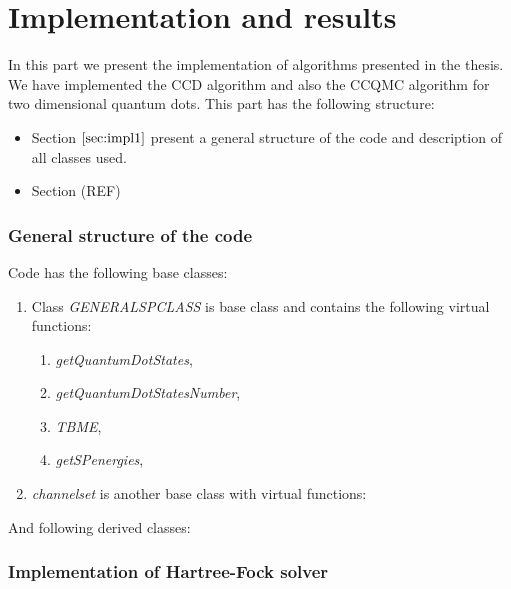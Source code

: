\documentclass[twoside,english]{uiofysmaster}
\theoremstyle{definition}
\begin{document}
\part{Implementation and results}
In this part we present the implementation of algorithms presented in the thesis. We have implemented the CCD algorithm and also the CCQMC algorithm for two dimensional quantum dots. 
This part has the following structure:\\
\begin{itemize}
\item Section $\ref{sec:impl1}$ present a general structure of the code and description of all classes used.
\item Section (REF) 
\end{itemize}

\section{General structure of the code}\label{sec:impl1}
Code has the following base classes:
\begin{enumerate}
\item Class \textit{GENERALSPCLASS} is base class and contains the following virtual functions:
	\begin{enumerate}
	\item \textit{getQuantumDotStates},
	\item \textit{getQuantumDotStatesNumber},
	\item \textit{TBME},
	\item \textit{getSPenergies},
	\end{enumerate}
\item \textit{channelset} is another base class with virtual functions:
\end{enumerate}
And following derived classes:

\section{Implementation of Hartree-Fock solver}
\end{document}
